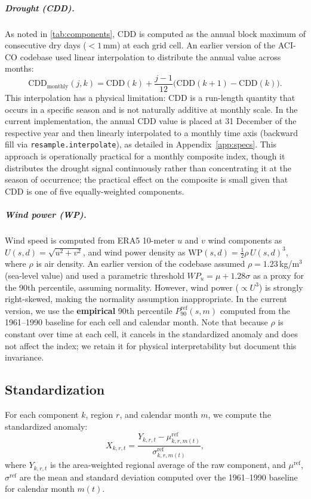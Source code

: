 \documentclass[12pt]{article}
\begin{document}
\subparagraph{Drought (CDD).} As noted in \cref{tab:components}, CDD is computed as the annual block maximum of consecutive dry days ($<1$\,mm) at each grid cell. An earlier version of the ACI-CO codebase used linear interpolation to distribute the annual value across months:
\begin{equation}\label{eq:cdd_interp}
\mathrm{CDD}_{\mathrm{monthly}}(j,k) = \mathrm{CDD}(k) + \frac{j-1}{12}\big(\mathrm{CDD}(k+1) - \mathrm{CDD}(k)\big).
\end{equation}
This interpolation has a physical limitation: CDD is a run-length quantity that occurs in a specific season and is not naturally additive at monthly scale. In the current implementation, the annual CDD value is placed at 31 December of the respective year and then linearly interpolated to a monthly time axis (backward fill via \texttt{resample.interpolate}), as detailed in Appendix~\ref{app:specs}. This approach is operationally practical for a monthly composite index, though it distributes the drought signal continuously rather than concentrating it at the season of occurrence; the practical effect on the composite is small given that CDD is one of five equally-weighted components.

\subparagraph{Wind power (WP).} Wind speed is computed from ERA5 10-meter $u$ and $v$ wind components as $U(s,d) = \sqrt{u^2 + v^2}$, and wind power density as $\mathrm{WP}(s,d) = \frac{1}{2}\rho\,U(s,d)^3$, where $\rho$ is air density. An earlier version of the codebase assumed $\rho = 1.23$\,kg/m$^3$ (sea-level value) and used a parametric threshold $WP_u = \mu + 1.28\sigma$ as a proxy for the 90th percentile, assuming normality. However, wind power ($\propto U^3$) is strongly right-skewed, making the normality assumption inappropriate. In the current version, we use the \textbf{empirical} 90th percentile $P_{90}^{\mathrm{ref}}(s,m)$ computed from the 1961--1990 baseline for each cell and calendar month. Note that because $\rho$ is constant over time at each cell, it cancels in the standardized anomaly and does not affect the index; we retain it for physical interpretability but document this invariance.

\subsection{Standardization}\label{sec:standardization}

For each component $k$, region $r$, and calendar month $m$, we compute the standardized anomaly:
\begin{equation}\label{eq:zscore}
X_{k,r,t} = \frac{Y_{k,r,t} - \mu^{\mathrm{ref}}_{k,r,m(t)}}{\sigma^{\mathrm{ref}}_{k,r,m(t)}},
\end{equation}
where $Y_{k,r,t}$ is the area-weighted regional average of the raw component, and $\mu^{\mathrm{ref}}$, $\sigma^{\mathrm{ref}}$ are the mean and standard deviation computed over the 1961--1990 baseline for calendar month $m(t)$.
\end{document}
